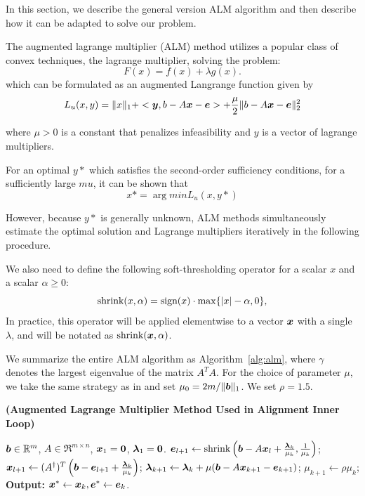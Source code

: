 \documentclass[10pt,twocolumn,letterpaper]{article}
\begin{document}
In this section, we describe the general version ALM algorithm and then describe how it can be adapted to solve our problem.

The augmented lagrange multiplier (ALM) method utilizes a popular class of convex techniques, the lagrange multiplier, solving the problem:
\begin{equation}
F(x) = f(x) + \lambda g(x).
\end{equation}
which can be formulated as an augmented Langrange function given by
\begin{equation}
L_u(x,y) = \|x\|_1 + <\boldsymbol{y}, b - A{\boldsymbol{x}} - \boldsymbol{e}> + \frac{\mu}2 \| b-A{\boldsymbol{x}}-\boldsymbol{e} \|_2^2
\end{equation}

where $\mu > 0$ is a constant that penalizes infeasibility and $y$ is a vector of lagrange multipliers.

For an optimal $y*$ which satisfies the second-order sufficiency conditions, for a sufficiently large $mu$, it can be shown that
\begin{equation}
x* = \arg min L_u(x,y*)
\end{equation}

However, because $y*$ is generally unknown, ALM methods simultaneously estimate the optimal solution and Lagrange multipliers iteratively in the following procedure.


We also need to define the following soft-thresholding operator for a
scalar $x$ and a scalar $\alpha \geq 0$:
\begin{equation}
\textup{shrink}(x,\alpha) = \textup{sign}(x)\cdot \max \{|x| - \alpha, 0\},
\end{equation}
In practice, this operator will be applied elementwise to a vector ${\boldsymbol{x}}$ with a single $\lambda$,
and will be notated as $\textup{shrink}({\boldsymbol{x}},\alpha)$.


We summarize the entire ALM
algorithm as Algorithm~\ref{alg:alm}, where $\gamma$ denotes the largest eigenvalue of the matrix $A^TA$. For the choice of parameter $\mu$, we take the same strategy as
in \cite{YangJ2009-pp} and set $\mu_0 = 2m / \|\boldsymbol{b}\|_1$. We set $\rho=1.5$.
\begin{algorithm}[h]
\caption{\bf (Augmented Lagrange Multiplier Method Used in Alignment Inner Loop)}
\begin{algorithmic}[1]
 $\boldsymbol{b} \in \mathbb R^m$, $A \in \Re^{m \times n}$,
${\boldsymbol{x}}_1 = \boldsymbol{0}$, $\boldsymbol{\lambda}_1 = \boldsymbol{0}$.
\STATE $\boldsymbol{e}_{l+1} \leftarrow \textup{shrink}\left(\boldsymbol{b} - A{\boldsymbol{x}}_l + \frac{\boldsymbol{\lambda}_k}{\mu_k}, \frac{1}{\mu_k}\right)$;
\STATE ${\boldsymbol{x}}_{l+1} \leftarrow (A^\dagger)^T \left(\boldsymbol{b} - \boldsymbol{e}_{l+1} + \frac{\boldsymbol{\lambda}_k}{\mu_k} \right) $;
\ENDWHILE
\STATE $\boldsymbol{\lambda}_{k+1} \leftarrow \boldsymbol{\lambda}_k + \mu (\boldsymbol{b} - A{\boldsymbol{x}}_{k+1} - \boldsymbol{e}_{k+1})$;
\STATE $\mu_{k+1} \leftarrow \rho\mu_k$;
\ENDWHILE \STATE
{\bf Output:} ${\boldsymbol{x}}^* \leftarrow {\boldsymbol{x}}_k, \boldsymbol{e}^* \leftarrow \boldsymbol{e}_k$.
\end{algorithmic}
\label{alg:alm}
\end{algorithm}
\end{document}
